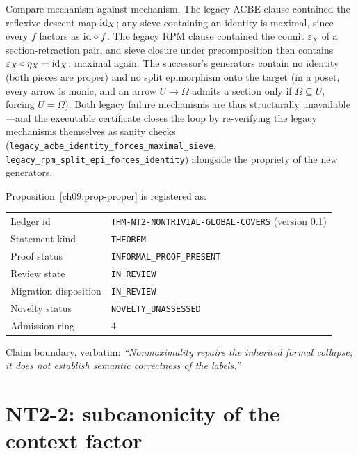 \begin{remark}\label{ch09:rem-escape}
Compare mechanism against mechanism. The legacy ACBE clause contained the reflexive descent map $\mathrm{id}_{X}$; any sieve containing an identity is maximal, since every $f$ factors as $\mathrm{id}\circ f$. The legacy RPM clause contained the counit $\varepsilon_{X}$ of a section-retraction pair, and sieve closure under precomposition then contains $\varepsilon_{X}\circ\eta_{X}=\mathrm{id}_{X}$: maximal again. The successor's generators contain no identity (both pieces are proper) and no split epimorphism onto the target (in a poset, every arrow is monic, and an arrow $U\to\Omega$ admits a section only if $\Omega\subseteq U$, forcing $U=\Omega$). Both legacy failure mechanisms are thus structurally unavailable---and the executable certificate closes the loop by re-verifying the legacy mechanisms themselves as sanity checks (\texttt{legacy\_acbe\_identity\_forces\_maximal\_sieve}, \texttt{legacy\_rpm\_split\_epi\_forces\_identity}) alongside the propriety of the new generators.
\end{remark}

\begin{remark}\label{ch09:rem-ledger-proper}
Proposition~\ref{ch09:prop-proper} is registered as:
\begin{center}
\begin{tabular}{@{}ll@{}}
\toprule
Ledger id & \texttt{THM-NT2-NONTRIVIAL-GLOBAL-COVERS} (version 0.1) \\
Statement kind & \texttt{THEOREM} \\
Proof status & \texttt{INFORMAL\_PROOF\_PRESENT} \\
Review state & \texttt{IN\_REVIEW} \\
Migration disposition & \texttt{IN\_REVIEW} \\
Novelty status & \texttt{NOVELTY\_UNASSESSED} \\
Admission ring & 4 \\
\bottomrule
\end{tabular}
\end{center}
Claim boundary, verbatim: \emph{``Nonmaximality repairs the inherited formal collapse; it does not establish semantic correctness of the labels.''}
\end{remark}

\section{NT2-2: subcanonicity of the context factor}\label{ch09:sec-nt22}

